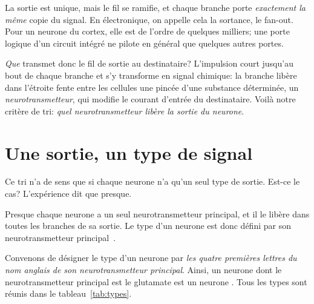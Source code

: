 La sortie est unique, mais le fil se ramifie, et chaque branche porte \emph{exactement la même} copie du signal. En électronique, on appelle cela la sortance, le fan-out. Pour un neurone du cortex, elle est de l'ordre de quelques milliers; une porte logique d'un circuit intégré ne pilote en général que quelques autres portes.

\emph{Que} transmet donc le fil de sortie au destinataire? L'impulsion court jusqu'au bout de chaque branche et s'y transforme en signal chimique: la branche libère dans l'étroite fente entre les cellules une pincée d'une substance déterminée, un \emph{neurotransmetteur}, qui modifie le courant d'entrée du destinataire. Voilà notre critère de tri: \emph{quel neurotransmetteur libère la sortie du neurone}.

\section{Une sortie, un type de signal}

Ce tri n'a de sens que si chaque neurone n'a qu'un seul type de sortie. Est-ce le cas? L'expérience dit que presque.

\begin{keyblock}
\begin{proposition}
\label{prop:dale}
Presque chaque neurone a un seul neurotransmetteur principal, et il le libère dans toutes les branches de sa sortie. Le type d'un neurone est donc défini par son neurotransmetteur principal~\cite{Strata1999}.
\end{proposition}
\end{keyblock}

Convenons de désigner le type d'un neurone par \emph{les quatre premières lettres du nom anglais de son neurotransmetteur principal}. Ainsi, un neurone dont le neurotransmetteur principal est le glutamate est un neurone . Tous les types sont réunis dans le tableau~\ref{tab:types}.

